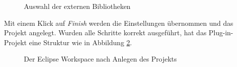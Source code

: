 \begin{figure}[H]
  \vspace{0.5cm}
  \centering
  \caption{Auswahl der externen Bibliotheken}
  \label{libs}
  \vspace{0.5cm}
\end{figure}

Mit einem Klick auf \textit{Finish} werden die Einstellungen übernommen und das Projekt angelegt. Wurden alle Schritte korrekt ausgeführt, hat das Plug-in-Projekt eine Struktur wie in Abbildung \ref{workspace}.

\begin{figure}[H]
  \vspace{0.5cm}
  \centering
  \caption{Der Eclipse Workspace nach Anlegen des Projekts}
  \label{workspace}
  \vspace{0.5cm}
\end{figure}

